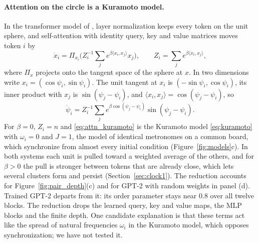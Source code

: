 \paragraph{Attention on the circle is a Kuramoto model.} In the transformer model of \citet{geshkovski2023mathematical}, layer normalization keeps every token on the unit sphere, and self-attention with identity query, key and value matrices moves token $i$ by
\begin{equation*}
\dot x_i=\Pi_{x_i}\Big(Z_i^{-1}\sum_j e^{\beta\langle x_i,x_j\rangle}x_j\Big),\qquad Z_i=\sum_j e^{\beta\langle x_i,x_j\rangle},
\end{equation*}
where $\Pi_x$ projects onto the tangent space of the sphere at $x$. In two dimensions write $x_i=(\cos\psi_i,\sin\psi_i)$. The unit tangent at $x_i$ is $(-\sin\psi_i,\cos\psi_i)$, its inner product with $x_j$ is $\sin(\psi_j-\psi_i)$, and $\langle x_i,x_j\rangle=\cos(\psi_j-\psi_i)$, so
\begin{equation}
\dot\psi_i=Z_i^{-1}\sum_j e^{\beta\cos(\psi_j-\psi_i)}\sin(\psi_j-\psi_i).
\label{eq:attn_kuramoto}
\end{equation}
For $\beta=0$, $Z_i=n$ and \eqref{eq:attn_kuramoto} is the Kuramoto model \eqref{eq:kuramoto} with $\omega_i=0$ and $J=1$, the model of identical metronomes on a common board, which synchronize from almost every initial condition (Figure~\ref{fig:models}c). In both systems each unit is pulled toward a weighted average of the others, and for $\beta>0$ the pull is stronger between tokens that are already close, which lets several clusters form and persist (Section~\ref{sec:clock1}). The reduction accounts for Figure~\ref{fig:pair_depth}(c) and for GPT-2 with random weights in panel (d). Trained GPT-2 departs from it: its order parameter stays near 0.8 over all twelve blocks. The reduction drops the learned query, key and value maps, the MLP blocks and the finite depth. One candidate explanation is that these terms act like the spread of natural frequencies $\omega_i$ in the Kuramoto model, which opposes synchronization; we have not tested it.


